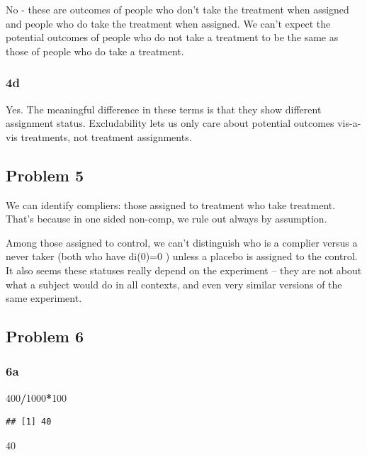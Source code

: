 \documentclass[
]{article}
\newenvironment{Shaded}{\begin{snugshade}}{\end{snugshade}}
\newcommand{\DecValTok}[1]{\textcolor[rgb]{0.00,0.00,0.81}{#1}}
\newcommand{\SpecialCharTok}[1]{\textcolor[rgb]{0.81,0.36,0.00}{\textbf{#1}}}
\begin{document}
No - these are outcomes of people who don't take the treatment when
assigned and people who do take the treatment when assigned. We can't
expect the potential outcomes of people who do not take a treatment to
be the same as those of people who do take a treatment.

\subsubsection{4d}\label{d}

Yes. The meaningful difference in these terms is that they show
different assignment status. Excludability lets us only care about
potential outcomes vis-a-vis treatments, not treatment assignments.

\subsection{Problem 5}\label{problem-5}

We can identify compliers: those assigned to treatment who take
treatment. That's because in one sided non-comp, we rule out always by
assumption.

Among those assigned to control, we can't distinguish who is a complier
versus a never taker (both who have di(0)=0 ) unless a placebo is
assigned to the control. It also seems these statuses really depend on
the experiment -- they are not about what a subject would do in all
contexts, and even very similar versions of the same experiment.

\subsection{Problem 6}\label{problem-6}

\subsubsection{6a}\label{a-2}

\begin{Shaded}
\begin{Highlighting}[]
\DecValTok{400}\SpecialCharTok{/}\DecValTok{1000}\SpecialCharTok{*}\DecValTok{100}
\end{Highlighting}
\end{Shaded}

\begin{verbatim}
## [1] 40
\end{verbatim}

40
\end{document}
